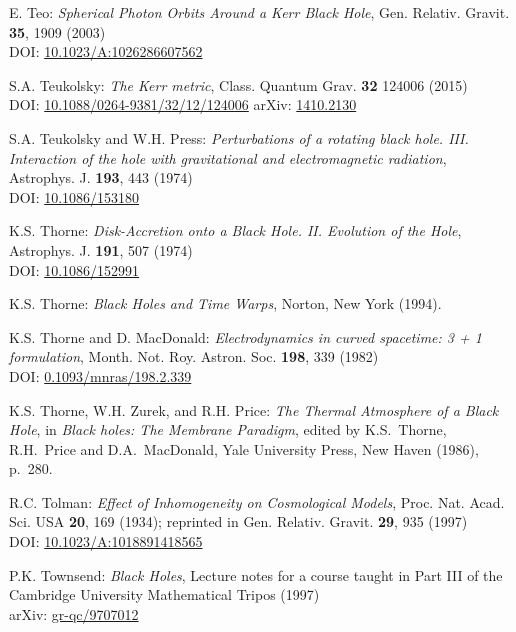 \begin{thebibliography}{123}
E. Teo:
{\em Spherical Photon Orbits Around a Kerr Black Hole},
Gen. Relativ. Gravit. {\bf 35}, 1909 (2003)\\
DOI: \href{https://doi.org/10.1023/A:1026286607562}{10.1023/A:1026286607562}

S.A. Teukolsky:
{\em The Kerr metric},
Class. Quantum Grav. {\bf 32} 124006 (2015)\\
DOI: \href{https://doi.org/10.1088/0264-9381/32/12/124006}{10.1088/0264-9381/32/12/124006}\hfill
arXiv: \href{https://arxiv.org/abs/1410.2130}{1410.2130}

S.A. Teukolsky and W.H. Press:
{\em Perturbations of a rotating black hole. III. Interaction of the hole with gravitational and electromagnetic radiation},
Astrophys. J. {\bf 193}, 443 (1974)\\
DOI: \href{https://doi.org/10.1086/153180}{10.1086/153180}

K.S. Thorne:
{\em Disk-Accretion onto a Black Hole. II. Evolution of the Hole},
Astrophys. J. {\bf 191}, 507 (1974)\\
DOI: \href{https://doi.org/10.1086/152991}{10.1086/152991}

K.S. Thorne:
{\em Black Holes and Time Warps},
Norton, New York (1994).

K.S. Thorne and D. MacDonald:
{\em Electrodynamics in curved spacetime: 3 + 1 formulation},
Month. Not. Roy. Astron. Soc. {\bf 198}, 339 (1982)\\
DOI: \href{https://doi.org/10.1093/mnras/198.2.339}{0.1093/mnras/198.2.339}

K.S. Thorne, W.H. Zurek, and R.H. Price:
{\em The Thermal Atmosphere of a Black Hole},
in {\em Black holes: The Membrane Paradigm},
edited by  K.S.~Thorne, R.H.~Price and D.A.~MacDonald,
Yale University Press, New Haven (1986), p.~280.

R.C. Tolman:
{\em Effect of Inhomogeneity on Cosmological Models},
Proc. Nat. Acad. Sci. USA {\bf 20}, 169 (1934);
reprinted in Gen. Relativ. Gravit. {\bf 29}, 935 (1997)\\
DOI: \href{https://doi.org/10.1023/A:1018891418565}{10.1023/A:1018891418565}

P.K. Townsend: {\em Black Holes}, Lecture notes for a course taught in Part III
of the Cambridge University Mathematical Tripos (1997)\\
arXiv: \href{https://arxiv.org/abs/gr-qc/9707012}{gr-qc/9707012}


\end{thebibliography}
